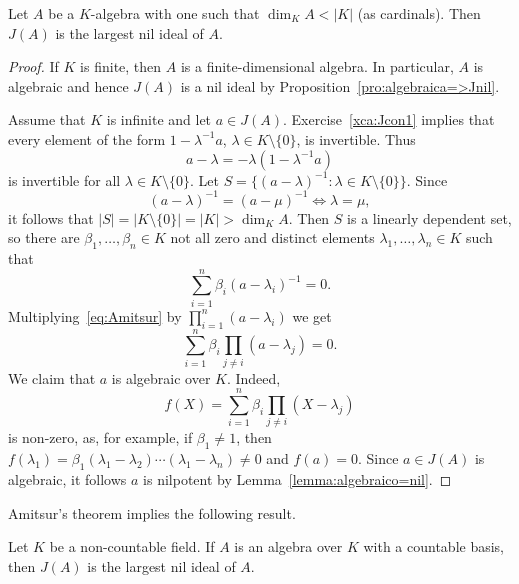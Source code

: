 \begin{theorem}[Amitsur]
	\label{thm:Amitsur}
	Let $A$ be a $K$-algebra with one such that $\dim_KA<|K|$ (as cardinals). Then 
	$J(A)$ is the largest nil ideal of $A$. 
\end{theorem}

\begin{proof}
	If $K$ is finite, then $A$ is a finite-dimensional algebra. In particular, $A$ is algebraic and
	hence $J(A)$ is a nil ideal by Proposition~\ref{pro:algebraica=>Jnil}.

	Assume that $K$ is infinite and let $a\in J(A)$. Exercise~\ref{xca:Jcon1} implies that 
	every element of the form 
	$1-\lambda^{-1}a$, $\lambda\in K\setminus\{0\}$, is invertible. Thus  
	\[
		a-\lambda=-\lambda(1-\lambda^{-1}a)
	\]
	is invertible for all $\lambda\in K\setminus\{0\}$. Let
	$S=\{(a-\lambda)^{-1}:\lambda\in K\setminus\{0\}\}$. Since 
	\[
	(a-\lambda)^{-1}=(a-\mu)^{-1}\Longleftrightarrow\lambda=\mu,
	\]
	it follows that $|S|=|K\setminus\{0\}|=|K|>\dim_KA$. Then $S$  
	is a linearly dependent set, so there are $\beta_1,\dots,\beta_n\in K$
	not all zero and distinct elements $\lambda_1,\dots,\lambda_n\in K$ such that 
	\begin{equation}
		\label{eq:Amitsur}
		\sum_{i=1}^n \beta_i(a-\lambda_i)^{-1}=0.
	\end{equation}
	Multiplying~\eqref{eq:Amitsur} by $\prod_{i=1}^n(a-\lambda_i)$ we get 
	\[
		\sum_{i=1}^n\beta_i\prod_{j\ne i}(a-\lambda_j)=0.
	\]
	We claim that $a$ is algebraic over $K$. Indeed,  
	\[
		f(X)=\sum_{i=1}^n\beta_i\prod_{j\ne i}(X-\lambda_j)
	\]
	is non-zero, as, for example, if $\beta_1\ne1$, then  
	$f(\lambda_1)=\beta_1(\lambda_1-\lambda_2)\cdots(\lambda_1-\lambda_n)\ne0$
	and $f(a)=0$. Since $a\in J(A)$ is algebraic, it follows
	$a$ is nilpotent by Lemma~\ref{lemma:algebraico=nil}.
\end{proof}

Amitsur's theorem implies the following result. 

\begin{corollary}
Let $K$ be a non-countable field. If $A$ is an algebra
over $K$ with a countable basis, then 
$J(A)$ is the largest nil ideal of $A$.
\end{corollary}





